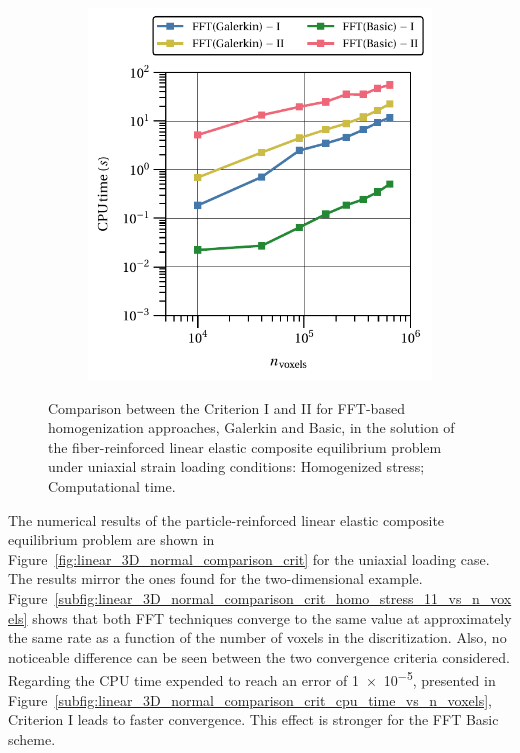 \begin{figure}[hbt]
\begin{subfigure}[b]{0.48\textwidth}
    \centering
    \includegraphics[width=\textwidth]{figures/linear_2D_normal_comparison_crit_cpu_time_vs_n_voxels}
    \caption{}
    \label{subfig:linear_2D_normal_comparison_crit_cpu_time_vs_n_voxels}
  \end{subfigure}
  \caption{Comparison between the Criterion I and II for FFT-based homogenization
  approaches, Galerkin and Basic, in the solution of the fiber-reinforced linear elastic
  composite equilibrium problem under uniaxial strain loading conditions:
   Homogenized
  stress; 
  Computational time.}
  \label{fig:linear_2D_normal_comparison_crit}
\end{figure}

The numerical results of the particle-reinforced linear elastic composite equilibrium problem are shown in Figure~\ref{fig:linear_3D_normal_comparison_crit} for the uniaxial loading case.
The results mirror the ones found for the two-dimensional example.
Figure~\ref{subfig:linear_3D_normal_comparison_crit_homo_stress_11_vs_n_voxels} shows that both FFT techniques converge to the same value at approximately the same rate as a function of the number of voxels in the discritization.
Also, no noticeable difference can be seen between the two convergence criteria considered.
Regarding the CPU time expended to reach an error of \num{1e-5}, presented in Figure~\ref{subfig:linear_3D_normal_comparison_crit_cpu_time_vs_n_voxels}, Criterion I leads to faster convergence.
This effect is stronger for the FFT Basic scheme.

